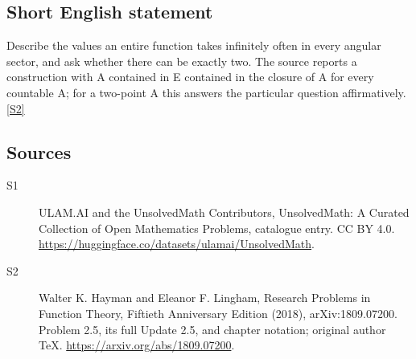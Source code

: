 \documentclass[11pt]{article}
\newcommand{\sref}[2]{\hyperlink{source:#1:#2}{[S#2]}}
\begin{document}
\subsection{Short English statement}
Describe the values an entire function takes infinitely often in every angular sector, and ask whether there can be exactly two. The source reports a construction with A contained in E contained in the closure of A for every countable A; for a two-point A this answers the particular question affirmatively. \sref{statement}{2}
\subsection{Sources}
\begin{description}
\item[\hypertarget{source:statement:1}{S1}] ULAM.AI and the UnsolvedMath Contributors, UnsolvedMath: A Curated Collection of Open Mathematics Problems, catalogue entry. CC BY 4.0. \url{https://huggingface.co/datasets/ulamai/UnsolvedMath}.
\item[\hypertarget{source:statement:2}{S2}] Walter K. Hayman and Eleanor F. Lingham, Research Problems in Function Theory, Fiftieth Anniversary Edition (2018), arXiv:1809.07200. Problem 2.5, its full Update 2.5, and chapter notation; original author TeX. \url{https://arxiv.org/abs/1809.07200}.
\end{description}
\label{end:statement}
\end{document}
